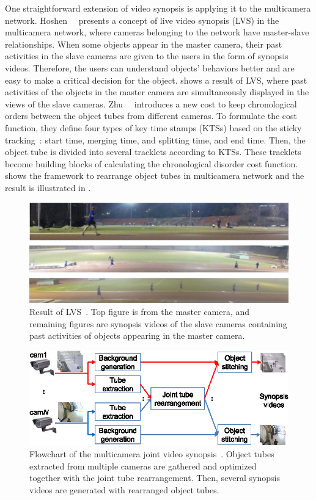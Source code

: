 \documentclass[11pt]{hyu_thesis}
\begin{document}
One straightforward extension of video synopsis is applying it to the multicamera network. Hoshen~\etal~\cite{Hoshen2015} presents a concept of live video synopsis (LVS) in the multicamera network, where cameras belonging to the network have master-slave relationships. When some objects appear in the master camera, their past activities in the slave cameras are given to the users in the form of synopsis videos. Therefore, the users can understand objects' behaviors better and are easy to make a critical decision for the object.  shows a result of LVS, where past activities of the objects in the master camera are simultaneously displayed in the views of the slave cameras. Zhu~\etal~\cite{Zhu2016} introduces a new cost to keep chronological orders between the object tubes from different cameras. To formulate the cost function, they define four types of key time stamps (KTSs) based on the sticky tracking~\cite{Feng2012}: start time, merging time, and splitting time, and end time. Then, the object tube is divided into several tracklets according to KTSs. These tracklets become building blocks of calculating the chronological disorder cost function.  shows the framework to rearrange object tubes in multicamera network and the result is illustrated in .

\begin{figure}
	\centering
	\includegraphics[width=\linewidth]{ext-hoshen01.png}
	\caption{Result of LVS~\cite{Hoshen2015}. Top figure is from the master camera, and remaining figures are synopsis videos of the slave cameras containing past activities of objects appearing in the master camera.}
	\label{fig:Hoshen}
\end{figure}

\begin{figure}
	\centering
	\includegraphics[width=\linewidth]{ext-zhu01.eps}
	\caption{Flowchart of the multicamera joint video synopsis~\cite{Zhu2016}. Object tubes extracted from multiple cameras are gathered and optimized together with the joint tube rearrangement. Then, several synopsis videos are generated with rearranged object tubes.}
	\label{fig:Zhu01}
\end{figure}
\end{document}

